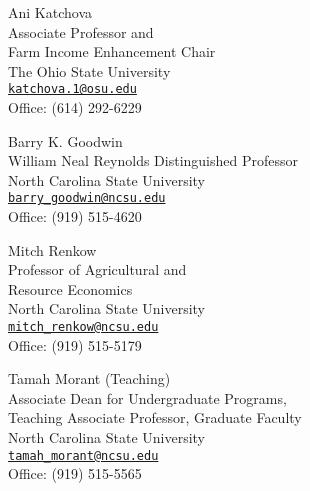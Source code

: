 \documentclass[letterpaper]{article}
\renewenvironment{itemize}{
  \begin{list}{}{
    \setlength{\leftmargin}{1.5em}
  }
}{
  \end{list}
}
\begin{document}
\begin{multicols}{2}
\begin{itemize}
\item Ani Katchova \\ Associate Professor and \\ Farm Income Enhancement Chair \\ The Ohio State University \\ \href{mailto:katchova.1@osu.edu}{\tt katchova.1@osu.edu} \\ Office: (614) 292-6229
\item Barry K. Goodwin \\ William Neal Reynolds Distinguished Professor \\ North Carolina State University \\ \href{mailto:barry\_goodwin@ncsu.edu}{\tt barry\_goodwin@ncsu.edu} \\ Office: (919) 515-4620

\item Mitch Renkow \\ Professor of Agricultural and \\ Resource Economics \\ North Carolina State University \\ \href{mailto:mitch\_renkow@ncsu.edu}{\tt mitch\_renkow@ncsu.edu} \\ Office: (919) 515-5179
\item Tamah Morant (Teaching) \\ Associate Dean for Undergraduate Programs, \\ Teaching Associate Professor, Graduate Faculty \\ North Carolina State University \\ \href{mailto:tamah\_morant@ncsu.edu}{\tt tamah\_morant@ncsu.edu} \\ Office: (919) 515-5565
\end{itemize}
\end{multicols}
\end{document}
